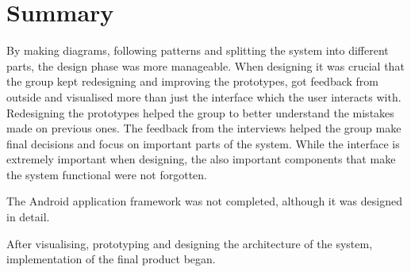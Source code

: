 \chapter{Summary}

By making diagrams, following patterns and splitting the system into different parts, the design phase was more manageable.
When designing it was crucial that the group kept redesigning and improving the prototypes, got feedback from outside and visualised more than just the interface which the user interacts with.
Redesigning the prototypes helped the group to better understand the mistakes made on previous ones.
The feedback from the interviews helped the group make final decisions and focus on important parts of the system.
While the interface is extremely important when designing, the also important components that make the system functional were not forgotten. 

The Android application framework was not completed, although it was designed in detail. 

After visualising, prototyping and designing the architecture of the system, implementation of the final product began.


